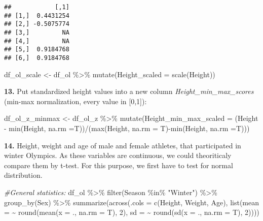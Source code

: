 \documentclass[
]{article}
\newenvironment{Shaded}{\begin{snugshade}}{\end{snugshade}}
\newcommand{\AttributeTok}[1]{\textcolor[rgb]{0.77,0.63,0.00}{#1}}
\newcommand{\CommentTok}[1]{\textcolor[rgb]{0.56,0.35,0.01}{\textit{#1}}}
\newcommand{\DecValTok}[1]{\textcolor[rgb]{0.00,0.00,0.81}{#1}}
\newcommand{\FunctionTok}[1]{\textcolor[rgb]{0.00,0.00,0.00}{#1}}
\newcommand{\NormalTok}[1]{#1}
\newcommand{\OtherTok}[1]{\textcolor[rgb]{0.56,0.35,0.01}{#1}}
\newcommand{\SpecialCharTok}[1]{\textcolor[rgb]{0.00,0.00,0.00}{#1}}
\newcommand{\StringTok}[1]{\textcolor[rgb]{0.31,0.60,0.02}{#1}}
\begin{document}
\begin{verbatim}
##            [,1]
## [1,]  0.4431254
## [2,] -0.5075774
## [3,]         NA
## [4,]         NA
## [5,]  0.9184768
## [6,]  0.9184768
\end{verbatim}

\begin{Shaded}
\begin{Highlighting}[]
\NormalTok{df\_ol\_scale }\OtherTok{\textless{}{-}}\NormalTok{ df\_ol }\SpecialCharTok{\%\textgreater{}\%} \FunctionTok{mutate}\NormalTok{(}\AttributeTok{Height\_scaled =} \FunctionTok{scale}\NormalTok{(Height))}
\end{Highlighting}
\end{Shaded}

\textbf{13. }Put standardized height values into a new column
\emph{Height\_min\_max\_scores} (min-max normalization, every value in
{[}0,1{]}):

\begin{Shaded}
\begin{Highlighting}[]
\NormalTok{df\_ol\_z\_minmax }\OtherTok{\textless{}{-}}\NormalTok{ df\_ol\_z }\SpecialCharTok{\%\textgreater{}\%} 
  \FunctionTok{mutate}\NormalTok{(}\AttributeTok{Height\_min\_max\_scaled =}\NormalTok{ (Height }\SpecialCharTok{{-}} \FunctionTok{min}\NormalTok{(Height, }\AttributeTok{na.rm =}\NormalTok{T))}\SpecialCharTok{/}\NormalTok{(}\FunctionTok{max}\NormalTok{(Height, }\AttributeTok{na.rm =}\NormalTok{ T)}\SpecialCharTok{{-}}\FunctionTok{min}\NormalTok{(Height, }\AttributeTok{na.rm =}\NormalTok{T)))}
\end{Highlighting}
\end{Shaded}

\textbf{14. }Height, weight and age of male and female athletes, that
participated in winter Olympics. As these variables are continuous, we
could theoriticaly compare them by t-test. For this purpose, we first
have to test for normal distribution.

\begin{Shaded}
\begin{Highlighting}[]
\CommentTok{\#General statistics:}
\NormalTok{df\_ol }\SpecialCharTok{\%\textgreater{}\%} \FunctionTok{filter}\NormalTok{(Season }\SpecialCharTok{\%in\%} \StringTok{"Winter"}\NormalTok{) }\SpecialCharTok{\%\textgreater{}\%} 
  \FunctionTok{group\_by}\NormalTok{(Sex) }\SpecialCharTok{\%\textgreater{}\%} 
  \FunctionTok{summarize}\NormalTok{(}\FunctionTok{across}\NormalTok{(}\AttributeTok{.cols =} \FunctionTok{c}\NormalTok{(Height, Weight, Age), }\FunctionTok{list}\NormalTok{(}\AttributeTok{mean =} \SpecialCharTok{\textasciitilde{}} \FunctionTok{round}\NormalTok{(}\FunctionTok{mean}\NormalTok{(}\AttributeTok{x =}\NormalTok{ ., }\AttributeTok{na.rm =}\NormalTok{ T), }\DecValTok{2}\NormalTok{), }\AttributeTok{sd =} \SpecialCharTok{\textasciitilde{}} \FunctionTok{round}\NormalTok{(}\FunctionTok{sd}\NormalTok{(}\AttributeTok{x =}\NormalTok{ ., }\AttributeTok{na.rm =}\NormalTok{ T), }\DecValTok{2}\NormalTok{))))}
\end{Highlighting}
\end{Shaded}
\end{document}
